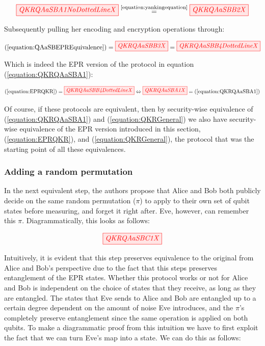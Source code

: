\documentclass[]{article}
\newcommand{\equaltext}[1]{\ensuremath{\stackrel{\text{#1}}{=}}}
\begin{document}
\begin{equation}
	\label{equation:QAaSBEPREquivalence}
	\begin{aligned}
	\tikzfig{QKRQAaSBA1NoDottedLineX} \equaltext{\ref{equation:yankingequation}} \tikzfig{QKRQAaSBB2X}
	\end{aligned}
\end{equation}

Subsequently pulling her encoding and encryption operations through:

\begin{equation}
\label{equation:EPRQKR}
	\begin{aligned}
 (\ref{equation:QAaSBEPREquivalence}) = \tikzfig{QKRQAaSBB3X} = \tikzfig{QKRQAaSBB4DottedLineX}
\end{aligned}
\end{equation}

Which is indeed the EPR version of the protocol in equation (\ref{equation:QKRQAaSBA1}): 

\begin{equation}
\label{equation:QKRQAaSBB4DottedLine}
	(\ref{equation:EPRQKR}) = \tikzfig{QKRQAaSBB4DottedLineX} \Leftrightarrow \tikzfig{QKRQAaSBA1X} = (\ref{equation:QKRQAaSBA1})
\end{equation}

Of course, if these protocols are equivalent, then by security-wise equivalence of (\ref{equation:QKRQAaSBA1}) and (\ref{equation:QKRGeneral}) we also have security-wise equivalence of the EPR version introduced in this section, (\ref{equation:EPRQKR}), and (\ref{equation:QKRGeneral}), the protocol that was the starting point of all these equivalences. 

\subsubsection{Adding a random permutation}

In the next equivalent step, the authors propose that Alice and Bob both publicly decide on the same random permutation ($\pi$) to apply to their own set of qubit states before measuring, and forget it right after. Eve, however, can remember this $\pi$. Diagrammatically, this looks as follows:

\begin{equation}
	\label{equation:QKRQAaSBC1}
	\tikzfig{QKRQAaSBC1X}
\end{equation}

Intuitively, it is evident that this step preserves equivalence to the original from Alice and Bob's perspective due to the fact that this steps preserves entanglement of the EPR states. Whether this protocol works or not for Alice and Bob is independent on the choice of states that they receive, as long as they are entangled. The states that Eve sends to Alice and Bob are entangled up to a certain degree dependent on the amount of noise Eve introduces, and the $\pi$'s completely preserve entanglement since the same operation is applied on both qubits. To make a diagrammatic proof from this intuition we have to first exploit the fact that we can turn Eve's map into a state. We can do this as follows:
\end{document}
